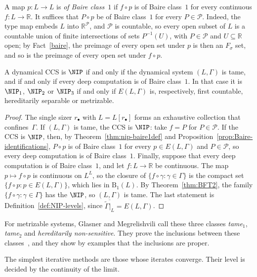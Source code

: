 A map $p\colon L\to L$ is \emph{of Baire class~$1$} if $f\circ p$ is of
Baire class~$1$ for every continuous $f\colon L\to\mathbb{R}$.
It suffices that $P\circ p$ be of Baire class~$1$ for every $P\in\mathcal{P}$.
Indeed, the type map embeds $L$ into $\mathbb{R}^{\mathcal{P}}$, and
$\mathcal{P}$ is countable, so every open subset of $L$ is a countable union
of finite intersections of sets $P^{-1}(U)$, with $P\in\mathcal{P}$ and
$U\subseteq\mathbb{R}$ open; by Fact~\ref{baire}, the preimage of every open
set under $p$ is then an $F_\sigma$ set, and so is the preimage of every open
set under $f\circ p$.

\begin{prop}\label{prop:cascade-tame}
A dynamical CCS is $\NIP$ if and only if the dynamical system $(L,\Gamma)$ is
tame, and if and only if every deep computation is of Baire class~$1$.
In that case it is $\NIP_1$, $\NIP_2$ or $\NIP_3$ if and only if $E(L,\Gamma)$ is,
respectively, first countable, hereditarily separable or metrizable.
\end{prop}

\begin{proof}
The single sizer $r_\bullet$ with $L=L[r_\bullet]$ forms an exhaustive
collection that confines~$\Gamma$.
If $(L,\Gamma)$ is tame, the CCS is $\NIP$: take $f=P$ for $P\in\mathcal{P}$.
If the CCS is $\NIP$, then, by Theorem~\ref{thm:nip-baire1def} and
Proposition~\ref{prop:Baire-identifications}, $P\circ p$ is of Baire
class~$1$ for every $p\in E(L,\Gamma)$ and $P\in\mathcal{P}$, so every deep
computation is of Baire class~$1$.
Finally, suppose that every deep computation is of Baire class~$1$, and let
$f\colon L\to\mathbb{R}$ be continuous.
The map $p\mapsto f\circ p$ is continuous on $L^L$, so the closure of
$\{f\circ\gamma:\gamma\in\Gamma\}$ is the compact set
$\{f\circ p:p\in E(L,\Gamma)\}$, which lies in $\mathrm{B}_1(L)$.
By Theorem~\ref{thm:BFT2}, the family $\{f\circ\gamma:\gamma\in\Gamma\}$ has the
$\NIP$, so $(L,\Gamma)$ is tame.
The last statement is Definition~\ref{def:NIP-levels}, since
$\overline{\tilde\Gamma|_{L}}=E(L,\Gamma)$.
\end{proof}

For metrizable systems, Glasner and Megrelishvili call these three classes
\emph{tame$_1$}, \emph{tame$_2$} and \emph{hereditarily non-sensitive}.
They prove the inclusions between these
classes~\cite[Proposition~0.6]{glasner2022tame}, and they show by examples
that the inclusions are proper.

The simplest iterative methods are those whose iterates converge.
Their level is decided by the continuity of the limit.

